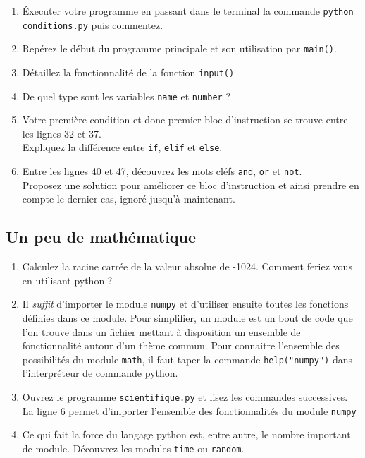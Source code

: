 \begin{enumerate}
\item Éxecuter votre programme en passant dans le terminal la commande \texttt{python conditions.py} puis commentez.

\item Repérez le début du programme principale et son utilisation par \texttt{main()}.

\item Détaillez la fonctionnalité de la fonction \texttt{input()}

\item De quel type sont les variables \texttt{name} et \texttt{number} ?

\item Votre première condition et donc premier bloc d'instruction se trouve entre les lignes 32 et 37.\\
  Expliquez la différence entre \texttt{if}, \texttt{elif} et \texttt{else}.

\item Entre les lignes 40 et 47, découvrez les mots cléfs \texttt{and}, \texttt{or} et \texttt{not}.\\
  Proposez une solution pour améliorer ce bloc d'instruction et ainsi prendre en
  compte le dernier cas, ignoré jusqu'à maintenant.


\end{enumerate}

\subsection{Un peu de mathématique}

\begin{enumerate}
\item Calculez la racine carrée de la valeur absolue de -1024.
  Comment feriez vous en utilisant python ?

\item Il \textit{suffit} d'importer le module \texttt{numpy} et d'utiliser ensuite
  toutes les fonctions définies dans ce module.
  Pour simplifier, un module est un bout de code que l'on trouve dans un fichier
  mettant à disposition un ensemble de fonctionnalité autour d'un thème commun.
  Pour connaitre l'ensemble des possibilités du module \texttt{math}, il faut taper la commande
  \texttt{help("numpy")} dans l'interpréteur de commande python.


\item Ouvrez le programme \texttt{scientifique.py} et lisez les commandes successives.
  La ligne 6 permet d'importer l'ensemble des fonctionnalités du module \texttt{numpy}

\item Ce qui fait la force du langage python est, entre autre, le nombre important de module.
  Découvrez les modules \texttt{time} ou \texttt{random}.


\end{enumerate}
